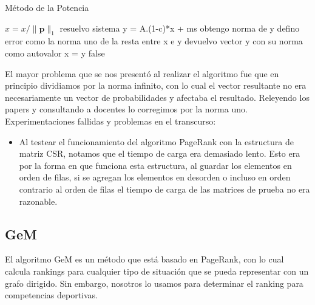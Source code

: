 \begin{algorithm}
\caption{Método de la Potencia}\label{metpot}
\begin{algorithmic}[1]


    \State $x = x/\lVert \mathbf{p} \rVert _{1}$
	    \State resuelvo sistema y = A.(1-c)*x + ms
 	    \State obtengo norma de y
 	    \State 	defino error como la norma uno de la resta entre x e y
      	\State devuelvo vector y con su norma como autovalor
      \Else
        \State x = y
      \EndIf
    \EndWhile
    \Return false
  \EndFunction

\end{algorithmic}
\end{algorithm}


El mayor problema que se nos presentó al realizar el algoritmo fue que en principio dividiamos por la norma infinito, con lo cual el vector resultante no era necesariamente un vector de probabilidades y afectaba el resultado. Releyendo los papers y consultando a docentes lo corregimos por la norma uno.\\


Experimentaciones fallidas y problemas en el transcurso:
\begin{itemize}
\item Al testear el funcionamiento del algoritmo PageRank con la estructura de matriz CSR, notamos que el tiempo de carga era demasiado lento. Esto era por la forma en que funciona esta estructura, al guardar los elementos en orden de filas, si se agregan los elementos en desorden o incluso en orden contrario al orden de filas el tiempo de carga de las matrices de prueba no era razonable.
\end{itemize}


\subsection{GeM}

El algoritmo GeM es un método que está basado en PageRank, con lo cual calcula rankings para cualquier tipo de situación que se pueda representar con un grafo dirigido. Sin embargo, nosotros lo usamos para determinar el ranking para competencias deportivas.\\

